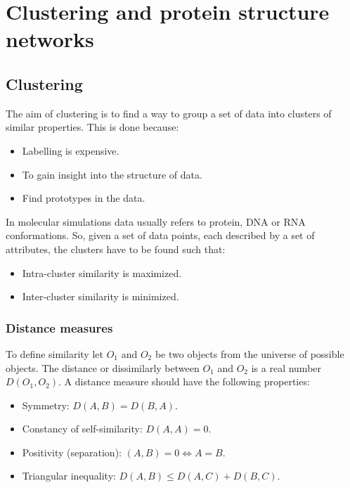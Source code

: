 \graphicspath{{chapters/16/images}}
\chapter{Clustering and protein structure networks}

\section{Clustering}
The aim of clustering is to find a way to group a set of data into clusters of similar properties.
This is done because:

\begin{multicols}{2}
	\begin{itemize}
		\item Labelling is expensive.
		\item To gain insight into the structure of data.
		\item Find prototypes in the data.
	\end{itemize}
\end{multicols}

In molecular simulations data usually refers to protein, DNA or RNA conformations.
So, given a set of data points, each described by a set of attributes, the clusters have to be found such that:

\begin{multicols}{2}
	\begin{itemize}
		\item Intra-cluster similarity is maximized.
		\item Inter-cluster similarity is minimized.
	\end{itemize}
\end{multicols}

	\subsection{Distance measures}
	To define similarity let $O_1$ and $O_2$ be two objects from the universe of possible objects.
	The distance or dissimilarly between $O_1$ and $O_2$ is a real number $D(O_1, O_2)$.
	A distance measure should have the following properties:

	\begin{itemize}
		\item Symmetry: $D(A,B) = D(B, A)$.
		\item Constancy of self-similarity: $D(A, A) = 0$.
		\item Positivity (separation): $(A, B) = 0\Leftrightarrow A=B$.
		\item Triangular inequality: $D(A, B) \le D(A, C) + D(B, C)$.
	\end{itemize}

